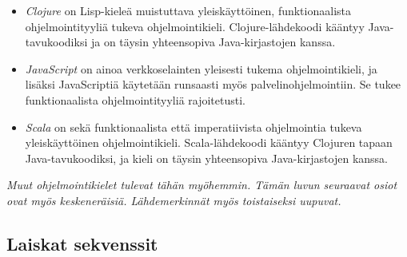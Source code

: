 \begin{itemize}

\item\textit{Clojure} on Lisp-kieleä muistuttava yleiskäyttöinen, funktionaalista ohjelmointityyliä tukeva ohjelmointikieli. Clojure-lähdekoodi kääntyy Java-tavukoodiksi ja on täysin yhteensopiva Java-kirjastojen kanssa.

\item \textit{JavaScript} on ainoa verkkoselainten yleisesti tukema ohjelmointikieli, ja lisäksi JavaScriptiä käytetään runsaasti myös palvelinohjelmointiin. Se tukee funktionaalista ohjelmointityyliä rajoitetusti.

\item\textit{Scala} on sekä funktionaalista että imperatiivista ohjelmointia tukeva yleiskäyttöinen ohjelmointikieli. Scala-lähdekoodi kääntyy Clojuren tapaan Java-tavukoodiksi, ja kieli on täysin yhteensopiva Java-kirjastojen kanssa.

\end{itemize}

\textit{Muut ohjelmointikielet tulevat tähän myöhemmin. Tämän luvun seuraavat osiot ovat myös keskeneräisiä. Lähdemerkinnät myös toistaiseksi uupuvat.}

\subsection{Laiskat sekvenssit}


% 
% 
% 

